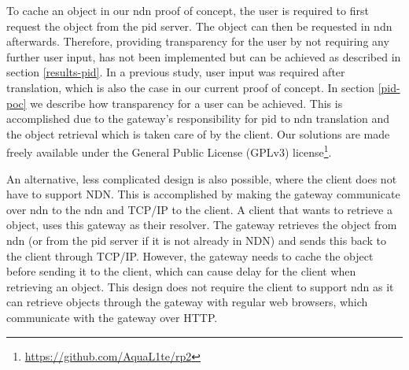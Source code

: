 To cache an object in our \gls{ndn} proof of concept, the user is required to first request the object from the \gls{pid} server. The object can then be requested in \gls{ndn} afterwards. Therefore, providing transparency for the user by not requiring any further user input, has not been implemented but can be achieved as described in section \ref{results-pid}. In a previous study, user input was required after translation, which is also the case in our current proof of concept. In section \ref{pid-poc} we describe how transparency for a user can be achieved. This is accomplished due to the gateway’s responsibility for \gls{pid} to \gls{ndn} translation and the object retrieval which is taken care of by the client. Our solutions are made freely available under the General Public License (GPLv3) license\footnote{\url{https://github.com/AquaL1te/rp2}}.

An alternative, less complicated design is also possible, where the client does not have to support NDN. This is accomplished by making the gateway communicate over \gls{ndn} to the \gls{ndn} and TCP/IP to the client. A client that wants to retrieve a object, uses this gateway as their resolver. The gateway retrieves the object from \gls{ndn} (or from the \gls{pid} server if it is not already in NDN) and sends this back to the client through TCP/IP. However, the gateway needs to cache the object before sending it to the client, which can cause delay for the client when retrieving an object. This design does not require the client to support \gls{ndn} as it can retrieve objects through the gateway with regular web browsers, which communicate with the gateway over HTTP. 


















